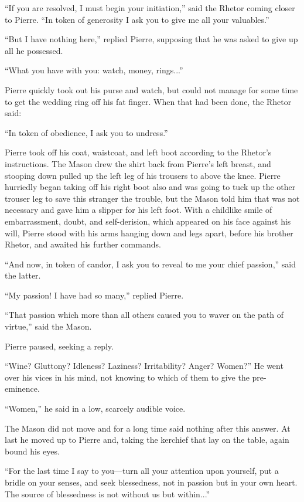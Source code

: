 ``If you are resolved, I must begin your initiation,'' said the
Rhetor coming closer to Pierre. ``In token of generosity I ask
you to give me all your valuables.''

``But I have nothing here,'' replied Pierre, supposing that he
was asked to give up all he possessed.

``What you have with you: watch, money, rings...''

Pierre quickly took out his purse and watch, but could not manage
for some time to get the wedding ring off his fat finger. When
that had been done, the Rhetor said:

``In token of obedience, I ask you to undress.''

Pierre took off his coat, waistcoat, and left boot according to
the Rhetor's instructions. The Mason drew the shirt back from
Pierre's left breast, and stooping down pulled up the left leg of
his trousers to above the knee. Pierre hurriedly began taking off
his right boot also and was going to tuck up the other trouser
leg to save this stranger the trouble, but the Mason told him
that was not necessary and gave him a slipper for his left
foot. With a childlike smile of embarrassment, doubt, and
self-derision, which appeared on his face against his will,
Pierre stood with his arms hanging down and legs apart, before
his brother Rhetor, and awaited his further commands.

``And now, in token of candor, I ask you to reveal to me your
chief passion,'' said the latter.

``My passion! I have had so many,'' replied Pierre.

``That passion which more than all others caused you to waver on
the path of virtue,'' said the Mason.

Pierre paused, seeking a reply.

``Wine? Gluttony? Idleness? Laziness? Irritability? Anger?
Women?'' He went over his vices in his mind, not knowing to which
of them to give the pre-eminence.

``Women,'' he said in a low, scarcely audible voice.

The Mason did not move and for a long time said nothing after
this answer. At last he moved up to Pierre and, taking the
kerchief that lay on the table, again bound his eyes.

``For the last time I say to you---turn all your attention upon
yourself, put a bridle on your senses, and seek blessedness, not
in passion but in your own heart. The source of blessedness is
not without us but within...''

